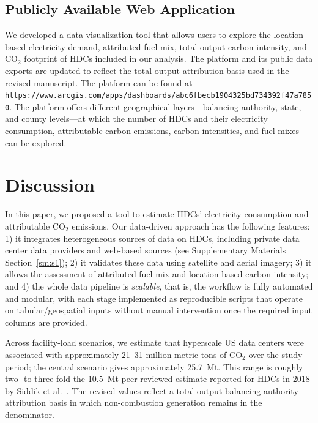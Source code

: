 \documentclass[12pt]{article}
\begin{document}
\subsection*{Publicly Available Web Application}

We developed a data visualization tool that allows users to explore the location-based electricity demand, attributed fuel mix, total-output carbon intensity, and CO$_2$ footprint of HDCs included in our analysis. The platform and its public data exports are updated to reflect the total-output attribution basis used in the revised manuscript. The platform can be found at \texttt{\url{https://www.arcgis.com/apps/dashboards/abc6fbecb1904325bd734392f47a7850}}. The platform offers different geographical layers---balancing authority, state, and county levels---at which the number of HDCs and their electricity consumption, attributable carbon emissions, carbon intensities, and fuel mixes can be explored.

\section*{Discussion}
 
In this paper, we proposed a tool to estimate HDCs' electricity consumption and attributable CO$_2$ emissions. Our data-driven approach has the following features: 1) it integrates heterogeneous sources of data on HDCs, including private data center data providers and web-based sources (see Supplementary Materials Section~\ref{sm:s1}); 2) it validates these data using satellite and aerial imagery; 3) it allows the assessment of attributed fuel mix and location-based carbon intensity; and 4) the whole data pipeline is \textit{scalable}, that is, the workflow is fully automated and modular, with each stage implemented as reproducible scripts that operate on tabular/geospatial inputs without manual intervention once the required input columns are provided.

Across facility-load scenarios, we estimate that hyperscale US data centers were associated with approximately 21--31 million metric tons of CO$_2$ over the study period; the central scenario gives approximately 25.7~Mt. This range is roughly two- to three-fold the 10.5~Mt peer-reviewed estimate reported for HDCs in 2018 by Siddik et al.~\cite{siddik2021environmental}. The revised values reflect a total-output balancing-authority attribution basis in which non-combustion generation remains in the denominator.
\end{document}
